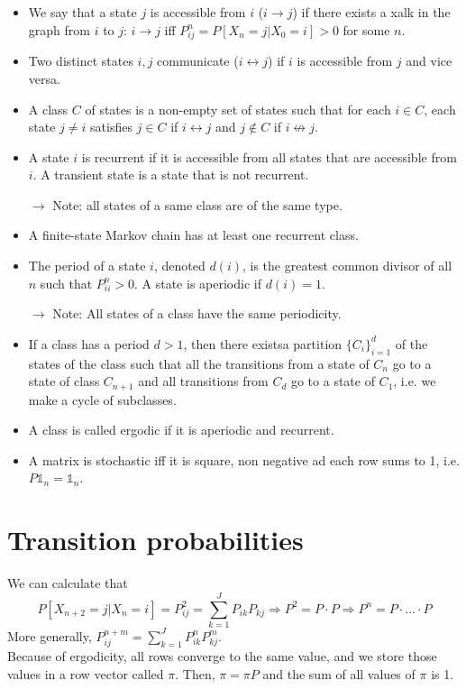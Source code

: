 \documentclass[12pt, openany]{report}
\theoremstyle{definition}
\begin{document}
\begin{itemize}
	\item We say that a state $j$ is accessible from $i$ ($i\to j$) if there exists a xalk in the graph from $i$ to $j$: $i\to j$ iff $P_{ij}^n = P[X_n=j|X_0=i]>0$ for some $n$.
	\item Two distinct states $i,j$ communicate ($i\leftrightarrow j$) if $i$ is accessible from $j$ and vice versa. 
	\item A class $C$ of states is a non-empty set of states such that for each $i\in C$, each state $j\neq i$ satisfies $j\in C$ if $i\leftrightarrow j$ and $j\not \in C$ if $i\not \leftrightarrow j$.
	\item A state $i$ is recurrent if it is accessible from all states that are accessible from $i$. A transient state is a state that is not recurrent.
	\item [$\to$] Note: all states of a same class are of the same type.
	\item A finite-state Markov chain has at least one recurrent class.
	\item The period of a state $i$, denoted $d(i)$, is the greatest common divisor of all $n$ such that $P_{ii}^n>0$. A state is aperiodic if $d(i)=1$.
	\item [$\to$] Note: All states of a class have the same periodicity.
	\item If a class has a period $d>1$, then there existsa  partition $\{C_i\}_{i=1}^d$ of the states of the class such that all the transitions from a state of $C_n$ go to a state of class $C_{n+1}$ and all transitions from $C_d$ go to a state of $C_1$, i.e. we make a cycle of subclasses. 
	\item A class is called ergodic if it is aperiodic and recurrent.
	\item A matrix is stochastic iff it is square, non negative ad each row sums to 1, i.e. $P\mathbb{1}_n=\mathbb{1}_n$. 
\end{itemize}
\section{Transition probabilities}
We can calculate that 
\begin{equation}
	P[X_{n+2}=j|X_n=i] = P_{ij}^2 = \sum_{k=1}^J P_{ik}P_{kj} \Longrightarrow P^2 = P\cdot P \Longrightarrow P^n = P\cdot... \cdot P
\end{equation}
More generally, $P_{ij}^{n+m} = \sum_{k=1}^J P_{ik}^nP_{kj}^m$.\\
Because of ergodicity, all rows converge to the same value, and we store those values in a row vector called $\pi$. Then, $\pi = \pi P$ and the sum of all values of $\pi$ is 1.\\ 
\end{document}
